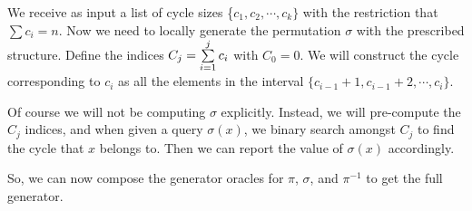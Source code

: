 We receive as input a list of cycle sizes \{$c_1, c_2,\cdots, c_k\}$ with the restriction that $\sum c_i = n$.
Now we need to locally generate the permutation $\sigma$ with the prescribed structure.
Define the indices $C_j = \sum\limits_{i=1}^{j}c_i$ with $C_0 = 0$.
We will construct the cycle corresponding to $c_i$ as all the elements in the interval $\{c_{i-1}+1,c_{i-1}+2,\cdots,c_i\}$.

Of course we will not be computing $\sigma$ explicitly.
Instead, we will pre-compute the $C_j$ indices, and when given a query $\sigma(x)$,
we binary search amongst $C_j$ to find the cycle that $x$ belongs to.
Then we can report the value of $\sigma(x)$ accordingly.

So, we can now compose the generator oracles for $\pi$, $\sigma$, and $\pi^{-1}$ to get the full generator. 
